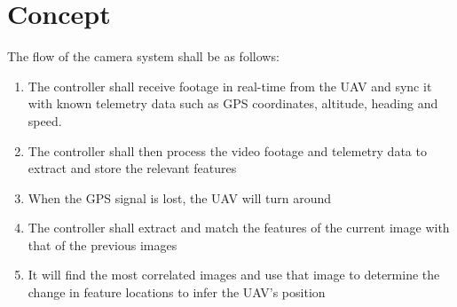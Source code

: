 \section*{Concept}

The flow of the camera system shall be as follows:

\begin{enumerate}
    \item The controller shall receive footage in real-time from the UAV and sync it with known telemetry data such as GPS coordinates, altitude, heading and speed.
    \item The controller shall then process the video footage and telemetry data to extract and store the relevant features
    \item When the GPS signal is lost, the UAV will turn around
    \item The controller shall extract and match the features of the current image with that of the previous images
    \item It will find the most correlated images and use that image to determine the change in feature locations to infer the UAV's position
\end{enumerate}

